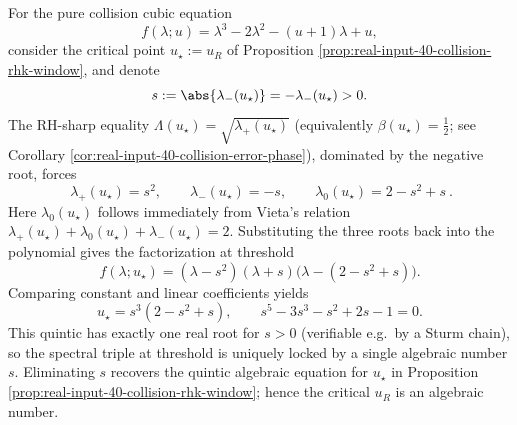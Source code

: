 \begin{remark}\label{rem:collision-cubic-rhsharp-quintic}
For the pure collision cubic equation
\[
f(\lambda;u)=\lambda^3-2\lambda^2-(u+1)\lambda+u,
\]
consider the critical point \(u_\star:=u_R\) of Proposition \ref{prop:real-input-40-collision-rhk-window}, and denote
\[
s:=\abs{\lambda_-(u_\star)}=-\lambda_-(u_\star)>0.
\]
The RH-sharp equality \(\Lambda(u_\star)=\sqrt{\lambda_+(u_\star)}\) (equivalently \(\beta(u_\star)=\tfrac12\); see Corollary \ref{cor:real-input-40-collision-error-phase}), dominated by the negative root, forces
\[
\boxed{\ \lambda_+(u_\star)=s^2,\qquad \lambda_-(u_\star)=-s,\qquad \lambda_0(u_\star)=2-s^2+s\ }.
\]
Here \(\lambda_0(u_\star)\) follows immediately from Vieta's relation \(\lambda_+(u_\star)+\lambda_0(u_\star)+\lambda_-(u_\star)=2\).
Substituting the three roots back into the polynomial gives the factorization at threshold
\[
f(\lambda;u_\star)=(\lambda-s^2)(\lambda+s)\bigl(\lambda-(2-s^2+s)\bigr).
\]
Comparing constant and linear coefficients yields
\[
u_\star=s^3(2-s^2+s),
\qquad
s^5-3s^3-s^2+2s-1=0.
\]
This quintic has exactly one real root for \(s>0\) (verifiable e.g.\ by a Sturm chain), so the spectral triple at threshold is uniquely locked by a single algebraic number \(s\).
Eliminating \(s\) recovers the quintic algebraic equation for \(u_\star\) in Proposition \ref{prop:real-input-40-collision-rhk-window}; hence the critical \(u_R\) is an algebraic number.
\end{remark}

